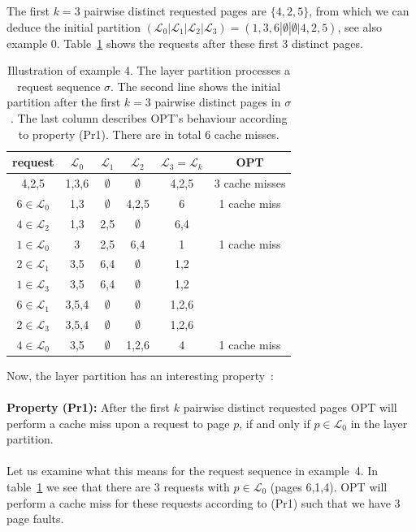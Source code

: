\documentclass[a4paper,12pt, titlepage]{article}  %
\newcommand{\cl}{\mathcal{L}}   %
\begin{document}
The first $k=3$ pairwise distinct requested pages are $\{4,2,5\}$,  
from which we can deduce the initial partition 
$(\cl_0 | \cl_1| \cl_2| \cl_3)=(1,3,6|\emptyset|\emptyset|4,2,5)$, see also example 0.  
Table~\ref{tab:example4} shows the requests after these first 3 distinct pages. \\

\begin{table}
\begin{center}
	\begin{tabular}[ht]{|c||c|c|c|c||c|}
	  \hline
		request &  $\cl_0$ & $\cl_1$ & $\cl_2$ & $\cl_3 = \cl_k$ & OPT \\
		\hline	
		4,2,5		& 1,3,6 	& $\emptyset$ 	&	 $\emptyset$	 &	4,2,5 &  3 cache misses \\
		\hline
	  $6 \in \cl_0$	& 1,3			& $\emptyset$		&  4,2,5				 &  6			&  1 cache miss\\
		\hline
		$4 \in \cl_2$ & 1,3			& 2,5           &  $\emptyset$   &  6,4   & \\
		\hline
		$1 \in \cl_0$ & 3       & 2,5           &  6,4           &  1     & 1 cache miss\\
		\hline
		$2 \in \cl_1$ & 3,5     & 6,4           & $\emptyset$    &  1,2    & \\
		\hline
		$1 \in \cl_3$ & 3,5     & 6,4           & $\emptyset$    &  1,2  & \\
		\hline
		$6 \in \cl_1$ & 3,5,4   & $\emptyset$   & $\emptyset$    & 1,2,6 & \\
		\hline
		$2 \in \cl_3$ & 3,5,4   & $\emptyset$   & $\emptyset$    & 1,2,6 & \\
		\hline
		$4 \in \cl_0$ & 3,5     & $\emptyset$   & 1,2,6          & 4     & 1 cache miss \\ 
		\hline
		
	\end{tabular}
	\caption{Illustration of example 4. The layer partition processes a request sequence $\sigma$.
	The second line shows the initial partition after the first $k=3$ pairwise distinct pages in $\sigma$.
	The last column describes OPT's behaviour according to property (Pr1). There are in total 6 cache misses.}
	\label{tab:example4}
\end{center}
\end{table}

\noindent Now, the layer partition has an interesting property~\cite{moruz_soda12}: \\
\\
\textbf{Property (Pr1):} After the first $k$ pairwise distinct requested pages 
OPT will perform a cache miss upon a request to page $p$, if and only if $p \in \cl_0$ in the layer partition.\\
\\
Let us examine what this means for the request sequence in example~4. In table~\ref{tab:example4} 
we see that there are 3 requests with $p \in \cl_0$ (pages 6,1,4). OPT will perform a cache miss for these
requests according to (Pr1) such that we have 3 page faults. 
\end{document}
